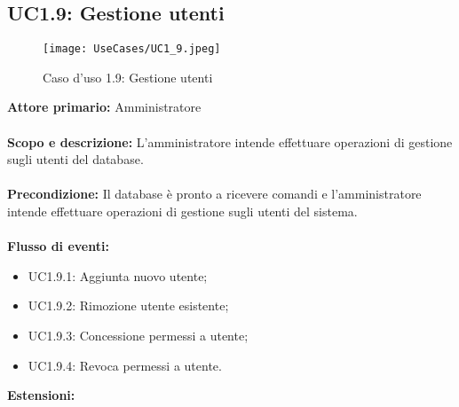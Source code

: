 \documentclass{scalatekids-article}
\begin{document}
\subsection{UC1.9: Gestione utenti}
\begin{figure}[H]
  \begin{center}
    \texttt{[image: UseCases/UC1\_9.jpeg]}
    \caption{Caso d'uso 1.9: Gestione utenti}
  \end{center}
\end{figure}
\textbf{Attore primario:} Amministratore\\ \\
\textbf{Scopo e descrizione:} L'amministratore intende effettuare operazioni di gestione sugli utenti del database.\\ \\
\textbf{Precondizione:} Il database è pronto a ricevere comandi e l'amministratore intende effettuare operazioni di gestione sugli utenti del sistema.\\ \\
\textbf{Flusso di eventi:}
\begin{itemize}
\item UC1.9.1: Aggiunta nuovo utente;
\item UC1.9.2: Rimozione utente esistente;
\item UC1.9.3: Concessione permessi a utente;
\item UC1.9.4: Revoca permessi a utente.
\end{itemize}
\textbf{Estensioni:}
\end{document}
